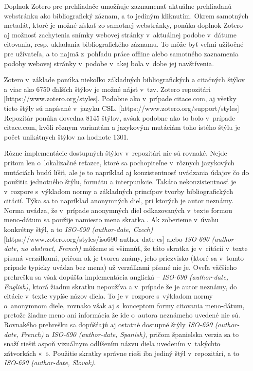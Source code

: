 \documentclass{fithesis3}
\begin{document}
	Doplnok Zotero pre prehliadače umožňuje zaznamenať aktuálne prehliadanú webstránku ako bibliografický záznam, a to jediným kliknutím. Okrem samotných metadát, ktoré je možné získať zo samotnej webstránky, ponúka doplnok Zotero aj možnosť zachytenia snímky webovej stránky v~aktuálnej podobe v~dátume citovania, resp. ukladania bibliografického záznamu. To môže byť veľmi užitočné pre užívateľa, a to najmä z~pohľadu práce offline alebo samotného zaznamenia podoby webovej stránky v~podobe v~akej bola v~dobe jej navštívenia.
	
	Zotero v~základe ponúka niekoľko základných bibliografických a citačných štýlov a viac ako 6750 ďalších štýlov je možné nájsť v~tzv. Zotero repozitári [https://www.zotero.org/styles]. Podobne ako v~prípade citace.com, aj všetky tieto štýly sú napísané v~jazyku CSL. [https://www.zotero.org/support/styles] Repozitár ponúka dovedna 8145 štýlov, avšak podobne ako to bolo v~prípade citace.com, kvôli rôznym variantám a jazykovým mutáciám toho istého štýlu je počet unikátnych štýlov na hodnote 1301.
	
	Rôzne implementácie dostupných štýlov v~repozitári nie sú rovnaké. Nejde pritom len o~lokalizačné reťazce, ktoré sa pochopiteľne v~rôznych jazykových mutáciách budú líšiť, ale je to napríklad aj konzistentnosť uvádzania údajov čo do použitia jednotného štýlu, formátu a interpunkcie. Takáto nekonzistentnosť je v~rozpore s~výkladom normy a základných princípov tvorby bibliografických citácií. Týka sa to napríklad anonymných diel, pri ktorých je autor neznámy. Norma uvádza, že v~prípade anonymných diel odkazovaných v~texte formou meno-dátum sa použije namiesto mena skratka . Ak zoberieme v~úvahu konkrétny štýl, a to \textit{ISO-690 (author-date, Czech)} [https://www.zotero.org/styles/iso690-author-date-cs] alebo \textit{ISO-690 (author-date, no abstract, French)} môžeme si všimnúť, že táto skratka je v~citácii v~texte písaná verzálkami, pričom ak je tvorca známy, jeho priezvisko (ktoré sa v~tomto prípade typicky uvádza bez mena) už verzálkami písané nie je. Oveľa väčšieho prehrešku sa však dopúšťa implementácia anglická -- \textit{ISO-690 (author-date, English)}, ktorá žiadnu skratku  nepoužíva a v~prípade že je autor neznámy, do citácie v~texte vypíše názov diela. To je v~rozpore s~výkladom normy o~anonymnom diele, rovnako však aj s~konceptom formy citovania meno-dátum, pretože žiadne meno ani informácia že ide o~autora neznámeho uvedené nie sú. Rovnakého prehrešku sa dopúšťajú aj ostatné dostupné štýly \textit{ISO-690 (author-date, French)} a \textit{ISO-690 (author-date, Spanish)}, pričom španielska verzia sa to snaží riešiť aspoň vizuálnym odlíšením názvu diela uvedením v~takýchto zátvorkách «~». Použitie skratky  správne rieši iba jediný štýl v~repozitári, a to \textit{ISO-690 (author-date, Slovak)}.
	
\end{document}
